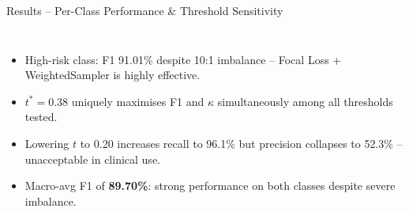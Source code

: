 \documentclass[aspectratio=169]{beamer}
\begin{document}
\begin{frame}{Results -- Per-Class Performance \& Threshold Sensitivity}
\begin{columns}[T]
\begin{itemize}
              -- almost perfect identification of non-events.
        \item High-risk class: F1 91.01\% despite 10:1 imbalance
              -- Focal Loss + WeightedSampler is highly effective.
        \item $t^*{=}0.38$ uniquely maximises F1 and $\kappa$
              simultaneously among all thresholds tested.
        \item Lowering $t$ to 0.20 increases recall to 96.1\%
              but precision collapses to 52.3\% --
              unacceptable in clinical use.
        \item Macro-avg F1 of \textbf{89.70\%}: strong
              performance on both classes despite severe imbalance.
      \end{itemize}
  \end{columns}
\end{frame}
\end{document}
